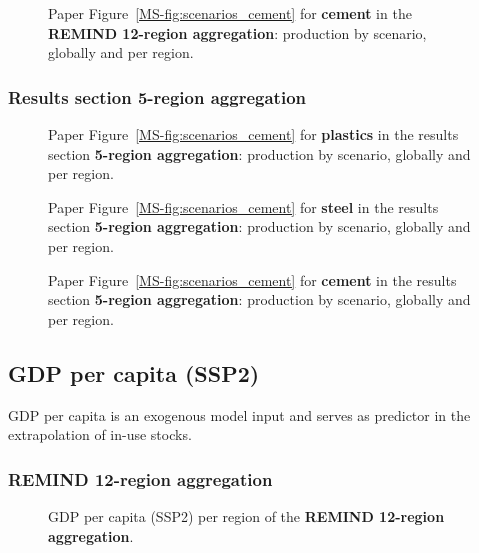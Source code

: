 \begin{figure}[htbp]
    \centering
    \caption{Paper Figure~\ref{MS-fig:scenarios_cement} for \textbf{cement} in the \textbf{REMIND 12-region aggregation}: production by scenario, globally and per region.}
    \label{fig:figure_11_cement_h12}
\end{figure}


\clearpage
\subsubsection{Results section 5-region aggregation}

\begin{figure}[htbp]
    \centering
    \caption{Paper Figure~\ref{MS-fig:scenarios_cement} for \textbf{plastics} in the results section \textbf{5-region aggregation}: production by scenario, globally and per region.}
    \label{fig:figure_11_plastics_agg5}
\end{figure}

\begin{figure}[htbp]
    \centering
    \caption{Paper Figure~\ref{MS-fig:scenarios_cement} for \textbf{steel} in the results section \textbf{5-region aggregation}: production by scenario, globally and per region.}
    \label{fig:figure_11_steel_agg5}
\end{figure}

\begin{figure}[htbp]
    \centering
    \caption{Paper Figure~\ref{MS-fig:scenarios_cement} for \textbf{cement} in the results section \textbf{5-region aggregation}: production by scenario, globally and per region.}
    \label{fig:figure_11_cement_agg5}
\end{figure}

\clearpage


\subsection{GDP per capita (SSP2)} \label{sec:add_gdppc}

GDP per capita is an exogenous model input and serves as predictor in the extrapolation of in-use stocks.

\subsubsection{REMIND 12-region aggregation}
\begin{figure}[htbp]
    \centering
    \caption{GDP per capita (SSP2) per region of the \textbf{REMIND 12-region aggregation}.}
    \label{fig:gdppc_h12}
\end{figure}

